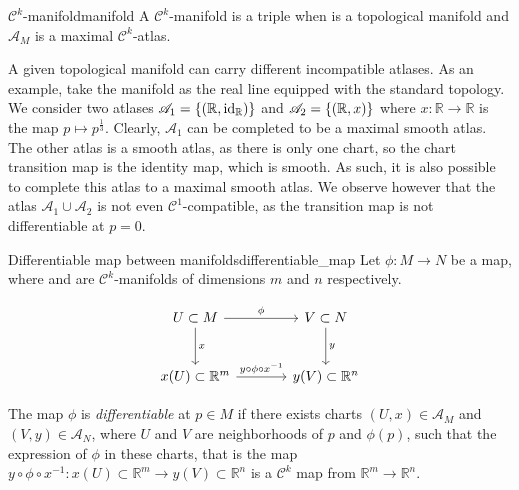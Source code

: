 \begin{definition}{\(\mathcal{C}^k\)-manifold}{manifold}
    A \(\mathcal{C}^k\)-manifold is a triple  when  is a topological manifold and \(\mathscr{A}_M\) is a maximal \(\mathcal{C}^k\)-atlas.
\end{definition}

\begin{remark}
    A given topological manifold can carry different incompatible atlases. As an example, take the manifold as the real line equipped with the standard topology. We consider two atlases \(\mathscr{A}_1 = \{(\mathbb{R}, \mathrm{id}_{\mathbb{R}})\}\) and \(\mathscr{A}_2 = \{(\mathbb{R}, x)\}\) where \(x : \mathbb{R} \to \mathbb{R}\) is the map \(p \mapsto p^{\frac13}\). Clearly, \(\mathscr{A}_1\) can be completed to be a maximal smooth atlas. The other atlas is a smooth atlas, as there is only one chart, so the chart transition map is the identity map, which is smooth. As such, it is also possible to complete this atlas to a maximal smooth atlas. We observe however that the atlas \(\mathscr{A}_1 \cup \mathscr{A}_2\) is not even \(\mathcal{C}^1\)-compatible, as the transition map is not differentiable at \(p = 0\).
\end{remark}

\begin{definition}{Differentiable map between manifolds}{differentiable_map}
    Let \(\phi : M \to N\) be a map, where  and  are \(\mathcal{C}^k\)-manifolds of dimensions \(m\) and \(n\) respectively.

    \begin{equation*}
        \begin{tikzcd}[column sep = large, row sep = large]
            U \subset M \arrow{d}{x}  \arrow{r}{\phi} & V \subset N \arrow{d}{y} \\
            x(U) \subset \mathbb{R}^m \arrow{r}{y\circ \phi \circ x^{-1}} & y(V) \subset \mathbb{R}^n
        \end{tikzcd}
    \end{equation*}

    The map \(\phi\) is \emph{differentiable} at \(p \in M\) if there exists charts \((U, x) \in \mathscr{A}_M\) and \((V, y) \in \mathscr{A}_N\), where \(U\) and \(V\) are neighborhoods of \(p\) and \(\phi(p)\), such that the expression of \(\phi\) in these charts, that is the map \(y \circ \phi \circ x^{-1} : x(U) \subset \mathbb{R}^m \to y(V) \subset \mathbb{R}^n\) is a \(\mathcal{C}^k\) map from \(\mathbb{R}^m\to \mathbb{R}^n\).
\end{definition}

